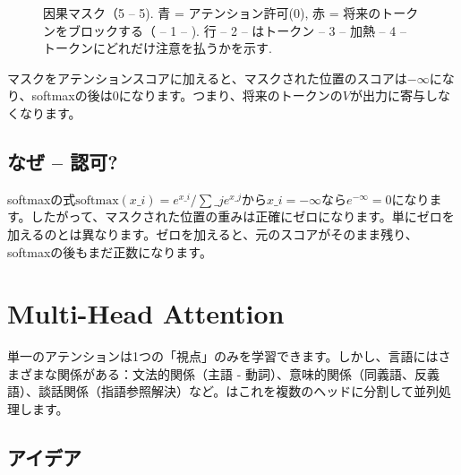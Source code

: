 \begin{figure}[htbp]
\centering
{}
\caption{因果マスク（5  --  5). 青 = アテンション許可(0), 赤 = 将来のトークンをブロックする（  -- 1 --  ). 行   -- 2 --  はトークン   -- 3 --  加熱   -- 4 --   トークンにどれだけ注意を払うかを示す.}
\label{fig:causal-mask}
\end{figure}

マスクをアテンションスコアに加えると、マスクされた位置のスコアは$-\infty$になり、softmaxの後は0になります。つまり、将来のトークンの$V$が出力に寄与しなくなります。

\subsection{なぜ   --  認可?}

softmaxの式$\text{softmax}(x\_i) = e^{x\_i} / \sum\_j e^{x\_j}$から$x\_i = -\infty$なら$e^{-\infty} = 0$になります。したがって、マスクされた位置の重みは正確にゼロになります。単にゼロを加えるのとは異なります。ゼロを加えると、元のスコアがそのまま残り、softmaxの後もまだ正数になります。

\section{Multi-Head Attention}

単一のアテンションは1つの「視点」のみを学習できます。しかし、言語にはさまざまな関係がある：文法的関係（主語 - 動詞）、意味的関係（同義語、反義語）、談話関係（指語参照解決）など。はこれを複数のヘッドに分割して並列処理します。

\subsection{アイデア}

